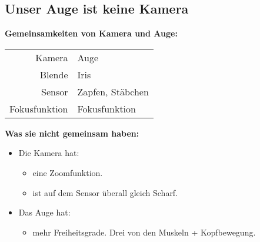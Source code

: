 \subsection{Unser Auge ist keine Kamera}

\textbf{Gemeinsamkeiten von Kamera und Auge:}\\ 

\begin{table}[H]
\centering
\begin{tabular}{|r|l|}
Kamera & Auge \\
Blende & Iris \\
Sensor & Zapfen, Stäbchen \\
Fokusfunktion & Fokusfunktion \\
\end{tabular}
\end{table}


\textbf{ Was sie nicht gemeinsam haben:}\\
\begin{itemize}
\item Die Kamera hat:
\begin{itemize}
	\item eine Zoomfunktion.
	\item ist auf dem Sensor überall gleich Scharf.
\end{itemize}
\item Das Auge hat:
\begin{itemize}
	\item mehr Freiheitsgrade. Drei von den Muskeln + Kopfbewegung.
\end{itemize}
\end{itemize}



